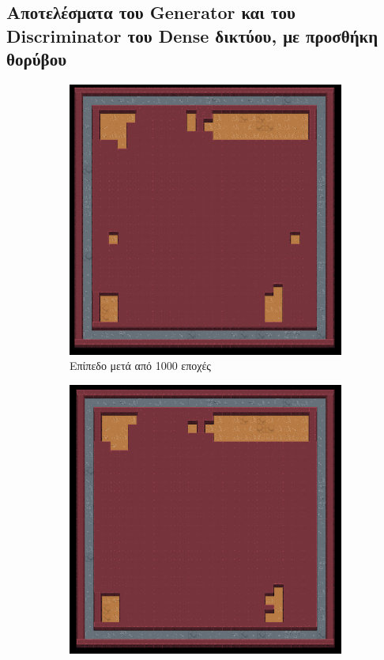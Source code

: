 \subsection{Αποτελέσματα του Generator και του Discriminator του Dense δικτύου, με προσθήκη θορύβου}
\begin{figure}[H]
\begin{subfigure}{.5\textwidth}
  \centering
  \includegraphics[width=.8\linewidth]{../images/result_images/dense-gan-with-fuzzy/combined_1000.png}
  \caption{Επίπεδο μετά από 1000 εποχές}
  \label{fig:sfig1}
\end{subfigure}%
\begin{subfigure}{.5\textwidth}
  \centering
  \includegraphics[width=.8\linewidth]{../images/result_images/dense-gan-with-fuzzy/combined_3000.png}

\end{subfigure}
\end{figure}
